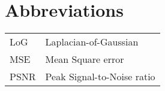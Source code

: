 \documentclass[master=cws, masteroption=vs]{kulemt}
\begin{document}
\section*{Abbreviations}
\begin{flushleft}
  \renewcommand{\arraystretch}{1.1}
  \begin{tabularx}{\textwidth}{@{}p{12mm}X@{}}
    LoG   & Laplacian-of-Gaussian \\
    MSE   & Mean Square error \\
    PSNR  & Peak Signal-to-Noise ratio \\
  \end{tabularx}
\end{flushleft}

\mainmatter















\appendixpage*          %
\appendix



\backmatter


\end{document}
